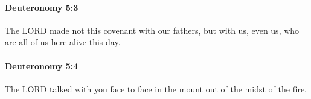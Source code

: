 		\paragraph{Deuteronomy 5:3} %
			\label{DEUTERONOMY-5-3}

			The LORD made not this covenant with our fathers, but with us, even us, who are all of us here alive this day.


		\paragraph{Deuteronomy 5:4} %
			\label{DEUTERONOMY-5-4}

			The LORD talked with you face to face in the mount out of the midst of the fire,


